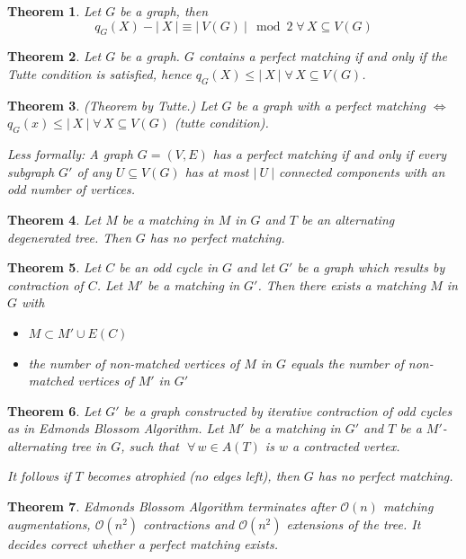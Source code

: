\documentclass{article}
\newtheorem{theorem}{Theorem}
\newcommand{\card}[1]{\left|\:\!#1\:\!\right|}
\newcommand{\fall}{\;\forall\,}
\begin{document}
\begin{theorem}
  Let $G$ be a graph, then
  \[ q_G(X) - \card{X} \equiv \card{V(G)} \mod{2} \fall X \subseteq V(G) \]
\end{theorem}
\begin{theorem}\label{satz-6.6}
  Let $G$ be a graph. $G$ contains a perfect matching if and only if the Tutte condition is satisfied,
  hence $q_G(X) \leq \card{X} \fall X \subseteq V(G)$.
\end{theorem}
\begin{theorem}
  (Theorem by Tutte.)
  Let $G$ be a graph with a perfect matching
  $\Leftrightarrow$ $q_G(x) \leq \card{X} \fall X \subseteq V(G)$ (tutte condition).

  Less formally:
  A graph $G = (V, E)$ has a perfect matching if and only if every subgraph $G'$
  of any $U \subseteq V(G)$ has at most $\card{U}$ connected components
  with an odd number of vertices.
\end{theorem}
\begin{theorem}\label{proposition-6.7}
  Let $M$ be a matching in $M$ in $G$ and $T$ be an alternating degenerated tree.
  Then $G$ has no perfect matching.
\end{theorem}
\begin{theorem}\label{proposition-6.8}
  Let $C$ be an odd cycle in $G$ and let $G'$ be a graph which results by contraction of $C$.
  Let $M'$ be a matching in $G'$. Then there exists a matching $M$ in $G$ with
  \begin{itemize}
    \item $M \subset M' \cup E(C)$
    \item the number of non-matched vertices of $M$ in $G$ equals the number of non-matched vertices of $M'$ in $G'$
  \end{itemize}
\end{theorem}
\begin{theorem}\label{proposition-6.9}
  Let $G'$ be a graph constructed by iterative contraction of odd cycles as in Edmonds Blossom Algorithm. Let $M'$ be a matching in $G'$ and $T$ be a $M'$-alternating tree in $G$, such that $\fall w \in A(T)$ is $w$ a contracted vertex.

  It follows if $T$ becomes atrophied (no edges left), then $G$ has no perfect matching.
\end{theorem}
\begin{theorem}\label{satz-6.10}
  Edmonds Blossom Algorithm terminates after $\mathcal{O}(n)$ matching augmentations,
  $\mathcal{O}(n^2)$ contractions and $\mathcal{O}(n^2)$ extensions of the tree.
  It decides correct whether a perfect matching exists.
\end{theorem}
\end{document}
